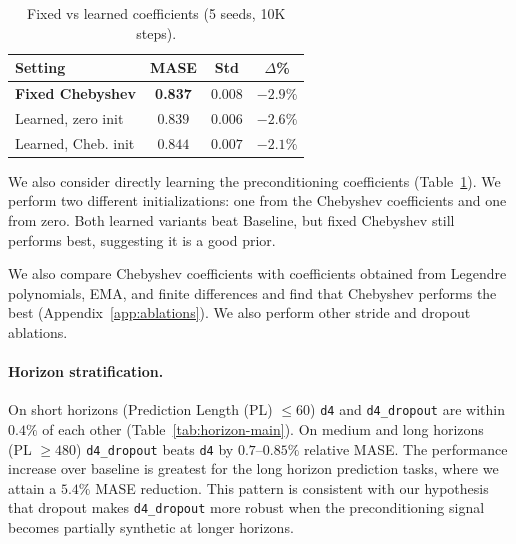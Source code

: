 \documentclass{article}
\begin{document}
\begin{table}[t]
\caption{Fixed vs learned coefficients (5 seeds, 10K steps).}
\label{tab:learned-coeff-main}
\vskip 0.05in
\centering
\begin{small}
\setlength{\tabcolsep}{2pt}
\begin{tabular}{@{}lccc@{}}
\toprule
\textbf{Setting} & \textbf{MASE} & \textbf{Std} & \textbf{$\Delta$\%} \\
\midrule
\textbf{Fixed Chebyshev} & \textbf{0.837} & $0.008$ & $\mathbf{-2.9\%}$ \\
Learned, zero init & $0.839$ & $0.006$ & $-2.6\%$ \\
Learned, Cheb. init & $0.844$ & $0.007$ & $-2.1\%$ \\
\bottomrule
\end{tabular}
\end{small}
\vskip -0.1in
\end{table}

We also consider directly learning the preconditioning coefficients (Table~\ref{tab:learned-coeff-main}). We perform two different initializations: one from the Chebyshev coefficients and one from zero. Both learned variants beat Baseline, but fixed Chebyshev still performs best, suggesting it is a good prior. 




We also compare Chebyshev coefficients with coefficients obtained from Legendre polynomials, EMA, and finite differences and find that Chebyshev performs the best (Appendix~\ref{app:ablations}). We also perform other stride and dropout ablations.

\paragraph{Horizon stratification.} On short horizons (Prediction Length (PL) $\leq 60$) \texttt{d4} and \texttt{d4\_dropout} are within $0.4\%$ of each other (Table~\ref{tab:horizon-main}). On medium and long horizons (PL $\geq 480$) \texttt{d4\_dropout} beats \texttt{d4} by $0.7$--$0.85\%$ relative MASE. The performance increase over baseline is greatest for the long horizon prediction tasks, where we attain a $5.4\%$ MASE reduction. This pattern is consistent with our hypothesis that dropout makes \texttt{d4\_dropout} more robust when the preconditioning signal becomes partially synthetic at longer horizons.
\end{document}
